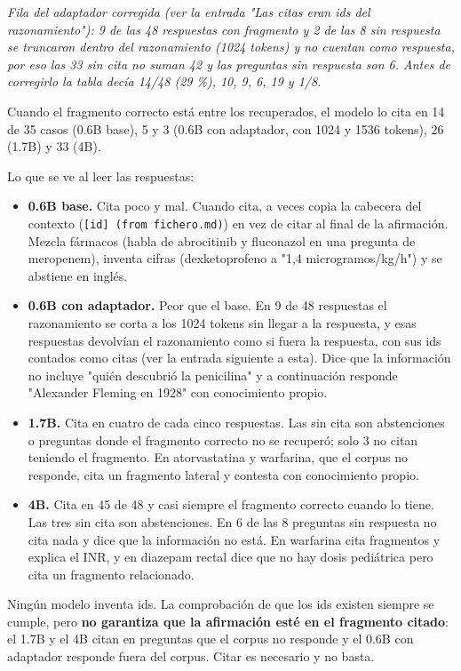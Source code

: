 \emph{Fila del adaptador corregida (ver la entrada "Las citas eran ids del razonamiento"): 9 de las 48
respuestas con fragmento y 2 de las 8 sin respuesta se truncaron dentro del razonamiento (1024
tokens) y no cuentan como respuesta, por eso las 33 sin cita no suman 42 y las preguntas sin
respuesta son 6. Antes de corregirlo la tabla decía 14/48 (29 \%), 10, 9, 6, 19 y 1/8.}

Cuando el fragmento correcto está entre los recuperados, el modelo lo cita en 14 de 35 casos
(0.6B base), 5 y 3 (0.6B con adaptador, con 1024 y 1536 tokens), 26 (1.7B) y 33 (4B).

Lo que se ve al leer las respuestas:

\begin{itemize}
\tightlist
\item
  \textbf{0.6B base.} Cita poco y mal. Cuando cita, a veces copia la cabecera del contexto
  (\texttt{{[}id{]} (from fichero.md)}) en vez de citar al final de la afirmación. Mezcla fármacos (habla de
  abrocitinib y fluconazol en una pregunta de meropenem), inventa cifras (dexketoprofeno a
  "1,4 microgramos/kg/h") y se abstiene en inglés.
\item
  \textbf{0.6B con adaptador.} Peor que el base. En 9 de 48 respuestas el razonamiento se corta a los
  1024 tokens sin llegar a la respuesta, y esas respuestas devolvían el razonamiento como si fuera
  la respuesta, con sus ids contados como citas (ver la entrada siguiente a esta). Dice que la información no incluye "quién descubrió la penicilina" y a continuación
  responde "Alexander Fleming en 1928" con conocimiento propio.
\item
  \textbf{1.7B.} Cita en cuatro de cada cinco respuestas. Las sin cita son abstenciones o preguntas donde
  el fragmento correcto no se recuperó; solo 3 no citan teniendo el fragmento. En atorvastatina y
  warfarina, que el corpus no responde, cita un fragmento lateral y contesta con conocimiento propio.
\item
  \textbf{4B.} Cita en 45 de 48 y casi siempre el fragmento correcto cuando lo tiene. Las tres sin cita
  son abstenciones. En 6 de las 8 preguntas sin respuesta no cita nada y dice que la información no
  está. En warfarina cita fragmentos y explica el INR, y en
  diazepam rectal dice que no hay dosis pediátrica pero cita un fragmento relacionado.
\end{itemize}

Ningún modelo inventa ids. La comprobación de que los ids existen siempre se cumple, pero
\textbf{no garantiza que la afirmación esté en el fragmento citado}: el 1.7B y el 4B citan en preguntas
que el corpus no responde y el 0.6B con adaptador responde fuera del corpus. Citar es necesario y
no basta.

